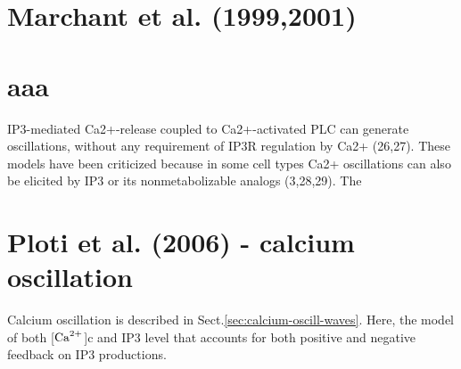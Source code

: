 \section{Marchant et al. (1999,2001)}

\citep{marchant1999, marchant2001}


\section{aaa}

IP3-mediated Ca2+-release coupled to Ca2+-activated PLC can generate
oscillations, without any requirement of IP3R regulation by Ca2+ (26,27). These
models have been criticized because in some cell types Ca2+ oscillations can
also be elicited by IP3 or its nonmetabolizable analogs (3,28,29). The


\section{Ploti et al. (2006) - calcium oscillation}


Calcium oscillation is described in Sect.\ref{sec:calcium-oscill-waves}.
Here, the model of both [${\text{Ca}^{2+}}$]c and IP3 level that accounts for both positive
and negative feedback on IP3 productions.
